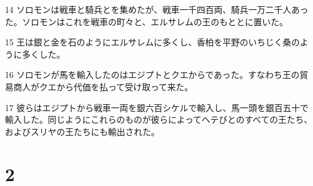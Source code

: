 \par 14 ソロモンは戦車と騎兵とを集めたが、戦車一千四百両、騎兵一万二千人あった。ソロモンはこれを戦車の町々と、エルサレムの王のもととに置いた。
\par 15 王は銀と金を石のようにエルサレムに多くし、香柏を平野のいちじく桑のように多くした。
\par 16 ソロモンが馬を輸入したのはエジプトとクエからであった。すなわち王の貿易商人がクエから代価を払って受け取って来た。
\par 17 彼らはエジプトから戦車一両を銀六百シケルで輸入し、馬一頭を銀百五十で輸入した。同じようにこれらのものが彼らによってヘテびとのすべての王たち、およびスリヤの王たちにも輸出された。

\chapter{2}

